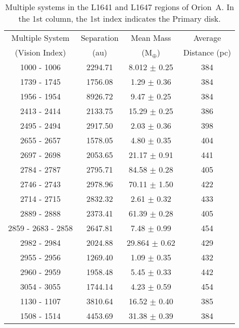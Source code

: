 
%

\onecolumn
\begin{longtable}{cccc}
\caption{Multiple systems in the L1641 and L1647 regions of Orion~A. In the 1st column, the 1st index indicates the Primary disk.}\\ %
\hline\hline                       %
 Multiple System & Separation & Mean Mass & Average  \\
 (Vision Index) & (au) & (M$_{\oplus}$) & Distance (pc)\\
\hline\hline 
 1000 - 1006 &  2294.71 & 8.012 $\pm$ 0.25 & 384 \\
 1739 - 1745 &  1756.08 & 1.29 $\pm$ 0.36 & 384 \\
 1956 - 1954 &  8926.72 & 9.47 $\pm$ 0.25 & 384 \\
 2413 - 2414 &  2133.75 & 15.29 $\pm$ 0.25 & 386 \\
 2495 - 2494 &  2917.50 & 2.03 $\pm$ 0.36 & 398 \\
 2655 - 2657 &  1578.05 & 4.80 $\pm$ 0.35 & 404 \\
 2697 - 2698 &  2053.65 & 21.17 $\pm$ 0.91 & 441 \\
 2784 - 2787 &  2795.71 & 84.58 $\pm$ 0.28 & 405 \\
 2746 - 2743 &  2978.96 & 70.11 $\pm$ 1.50 & 422 \\
 2714 - 2715 &  2832.32 & 2.61 $\pm$ 0.32 & 433 \\
 2889 - 2888 &  2373.41 & 61.39 $\pm$ 0.28 & 405 \\
 2859 - 2683 - 2858 & 2647.81 & 7.48 $\pm$ 0.99 & 454 \\
 2982 - 2984 &  2024.88 & 29.864 $\pm$ 0.62 & 429 \\
 2955 - 2956 &  1269.40 & 1.09 $\pm$ 0.35 & 432 \\
 2960 - 2959 &  1958.48 & 5.45 $\pm$ 0.33 & 442 \\
 3054 - 3055 &  1744.14 & 4.23 $\pm$ 0.59 & 454 \\
 1130 - 1107 &  3810.64 & 16.52 $\pm$ 0.40 & 385 \\
 1508 - 1514 &  4453.69 & 31.38 $\pm$ 0.39 & 384 \\

\end{longtable}
